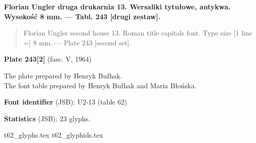 \documentclass[12pt]{article}
\newcommand{\bg}{\begingl}
\newcommand{\pismoPL}[1]{{\relsize{2}\Junicode\textbf{#1}}}
\newcommand{\pismoEN}[1]{{\relsize{1}\Junicode\begin{quote}#1\end{quote}}}
\newcommand{\plate}[3]{\textbf{Plate #1} (fasc. #2, #3)}
\newcommand{\exampleBib}[1]{{\relsize{2}\Junicode\textbf{The
      example:}\\[2ex] CATALOGUS LIBRORUM \textbf{#1}}}
\newcommand{\exampleDesc}[1]{{\relsize{0}\Junicode#1}}
\newcommand{\exampleDig}[1]{{\relsize{0}\Junicode \textbf{Digitization(s) [JSB]:} #1}}
\newcommand{\exampleLib}[1]{{\relsize{0}\Junicode \textbf{Library:} #1}}
\newcommand{\examplePL}[1]{}
\newcommand{\exampleEN}[1]{}
\newcommand{\fontID}[2]{{\relsize{1}\Junicode\textbf{Font identifier} (JSB): #1 (table #2)}}
\newcommand{\fontstat}[1]{{\relsize{1}\Junicode\textbf{Statistics} (JSB): #1 glyphs.}}
\newcommand{\exampleRef}[1]{{\relsize{0}\Junicode \textbf{References:} #1}}
\newcommand{\examplePage}[1]{{Page reference: \relsize{0}\Junicode#1}}
\begin{document}
 

 \pismoPL{Florian Ungler druga drukarnia 13. Wersaliki tytułowe, antykwa. Wysokość 8 mm. — Tabl. 243 [drugi zestaw].}
  
 \pismoEN{Florian Ungler second house 13. Roman title capitals font. Type size [1 line =] 8 mm. — Plate 243 [second set].}

\plate{243[2]}{V}{1964}

The plate prepared by Henryk Bułhak.\\
The font table prepared by Henryk Bułhak and Maria Błońska.

\bigskip














\bigskip

\fontID{U2-13}{62}

\fontstat{23}

  {t62_glyphs.tex}
  {t62_glyphids.tex}



 \newpage
 
% 
 
\end{document}
